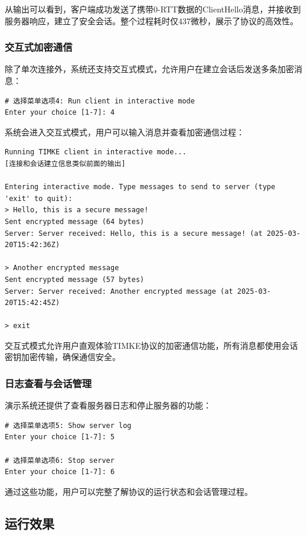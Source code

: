 从输出可以看到，客户端成功发送了携带0-RTT数据的ClientHello消息，并接收到服务器响应，建立了安全会话。整个过程耗时仅437微秒，展示了协议的高效性。

\subsubsection{交互式加密通信}

除了单次连接外，系统还支持交互式模式，允许用户在建立会话后发送多条加密消息：

\begin{verbatim}
# 选择菜单选项4: Run client in interactive mode
Enter your choice [1-7]: 4
\end{verbatim}

系统会进入交互式模式，用户可以输入消息并查看加密通信过程：

\begin{verbatim}
Running TIMKE client in interactive mode...
[连接和会话建立信息类似前面的输出]

Entering interactive mode. Type messages to send to server (type 'exit' to quit):
> Hello, this is a secure message!
Sent encrypted message (64 bytes)
Server: Server received: Hello, this is a secure message! (at 2025-03-20T15:42:36Z)

> Another encrypted message
Sent encrypted message (57 bytes)
Server: Server received: Another encrypted message (at 2025-03-20T15:42:45Z)

> exit
\end{verbatim}

交互式模式允许用户直观体验TIMKE协议的加密通信功能，所有消息都使用会话密钥加密传输，确保通信安全。

\subsubsection{日志查看与会话管理}

演示系统还提供了查看服务器日志和停止服务器的功能：

\begin{verbatim}
# 选择菜单选项5: Show server log
Enter your choice [1-7]: 5

# 选择菜单选项6: Stop server
Enter your choice [1-7]: 6
\end{verbatim}

通过这些功能，用户可以完整了解协议的运行状态和会话管理过程。

\subsection{运行效果}

